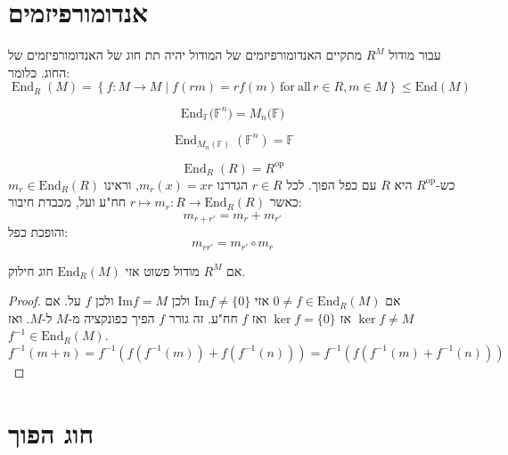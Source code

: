 \documentclass{tstextbook}
\begin{document}
\section{אנדומורפיזמים}

\begin{proposition}
עבור מודול \(R^{M}\) מתקיים האנדומורפיזמים של המודול יהיה תת חוג של האנדומורפיזמים של החוג. כלומר:
$$\operatorname{End}_{R}(M)=\left\{f:M\to M\mid f(r m)=r f(m)\,{\mathrm{for~all}}\,r\in R,m\in M\right\}\leq \mathrm{End}(M)$$

\end{proposition}
\begin{example}
$${\mathrm{End}}_{\mathbb{F}}{\bigl(}\mathbb{F}^{n}{\bigr)}=M_{n}{\bigl(}\mathbb{F}{\bigr)}$$

\end{example}
\begin{example}
$$\operatorname{End}_{M_{n}(\mathbb{F})}(\mathbb{F}^{n})=\mathbb{F}$$

\end{example}
\begin{example}
$$\operatorname{End}_{R}(R)=R^{\mathrm{op}}$$
כש-\(R^{\text{op}}\) היא \(R\) עם כפל הפוך. לכל \(r \in R\) הגדרנו \(m_{r}(x)=xr\), וראינו \(m_{r} \in \mathrm{End}_{R}(R)\) כאשר \(r \mapsto m_{r}:R\to \mathrm{End}_{R}(R)\) חח"ע ועל, מכבדת חיבור:
$$m_{r+r'}=m_{r}+m_{r'}$$
והופכת כפל:
$$m_{r r'}= m_{r'}\circ m_{r}$$

\end{example}
\begin{proposition}
אם \(R^{M}\) מודול פשוט אזי \(\mathrm{End}_{R}(M)\) חוג חילוק.

\end{proposition}
\begin{proof}
אם \(0\neq f \in \mathrm{End}_{R}(M)\) אזי \(\mathrm{\mathrm{Im}}f\neq \{ 0 \}\) ולכן \(\mathrm{Im} f = M\) ולכן \(f\) על.
אם \(\ker f \neq M\) אז \(\ker f = \{ 0 \}\) ואז \(f\) חח"ע.
זה גורר \(f\) הפיך כפונקציה מ-\(M\) ל-\(M\). ואז \(f ^{-1} \in \mathrm{End}_{R}(M)\).
$$f^{-1} (m+n)=f^{-1} (f(f^{-1} (m))+f(f^{-1} (n)))=f^{-1} (f(f^{-1} (m)+f^{-1} (n)))$$

\end{proof}
\section{חוג הפוך}
\end{document}
